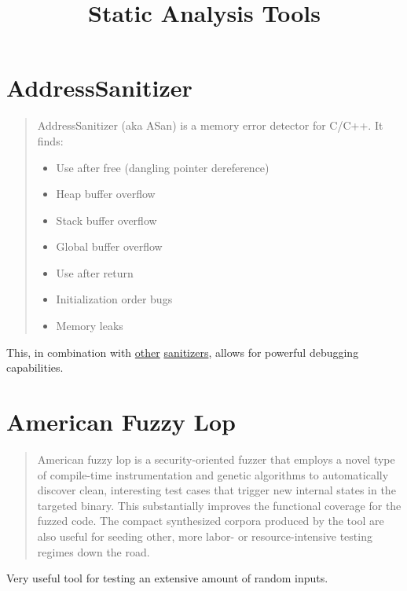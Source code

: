 \documentclass[12pt]{article}
\title{Static Analysis Tools}
\begin{document}
\maketitle
\tableofcontents
\section{AddressSanitizer}
\begin{quote}
AddressSanitizer (aka ASan) is a memory error detector for C/C++. It finds:

\begin{itemize}
    \item Use after free (dangling pointer dereference)
    \item Heap buffer overflow
    \item Stack buffer overflow
    \item Global buffer overflow
    \item Use after return
    \item Initialization order bugs
    \item Memory leaks
\end{itemize}
\end{quote}

\label{asan}
This, in combination with \hyperref[msan]{other} \hyperref[tsan]{sanitizers},
allows for powerful debugging capabilities.

\cite{asan}
\section{American Fuzzy Lop}
\begin{quote}
American fuzzy lop is a security-oriented fuzzer that employs a
novel type of compile-time instrumentation and genetic algorithms to
automatically discover clean, interesting test cases that trigger new
internal states in the targeted binary. This substantially improves
the functional coverage for the fuzzed code. The compact synthesized
corpora produced by the tool are also useful for seeding other,
more labor- or resource-intensive testing regimes down the road.
\end{quote}

Very useful tool for testing an extensive amount of random inputs.

\cite{afl}
\end{document}
